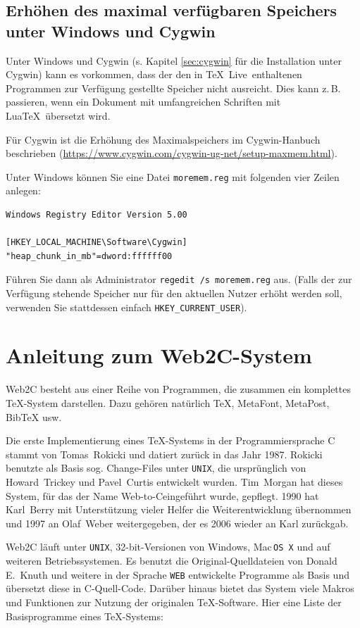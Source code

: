 \documentclass[12pt,ngerman,a4paper,fullparskip]{scrreprt}
\newcommand{\TL}{\TeX\ Live\xspace}
\newcommand{\acro}[1]{\texttt{#1}}
\newcommand{\code}[1]{\texttt{#1}}
\def\MP{MetaPost}
\def\MF{MetaFont}
\def\BibTeX{Bib\TeX}
\providecommand*{\MacOSX}{Mac\,\acro{OS\,X}\xspace}
\begin{document}
\section{Erhöhen des maximal verfügbaren Speichers unter Windows und Cygwin}
\label{sec:cygwin-maxmem}

Unter Windows und Cygwin (s. Kapitel \ref{sec:cygwin} für die Installation unter
Cygwin) kann es vorkommen, dass der den in \TL\ enthaltenen Programmen zur
Verfügung gestellte Speicher nicht ausreicht. Dies kann z.\,B. passieren, wenn 
ein Dokument mit umfangreichen Schriften mit Lua\TeX\ übersetzt wird.

Für Cygwin ist die Erhöhung des Maximalspeichers im Cygwin-Hanbuch beschrieben
(\url{https://www.cygwin.com/cygwin-ug-net/setup-maxmem.html}).

Unter Windows können Sie eine Datei \code{moremem.reg} mit folgenden vier
Zeilen anlegen:

\begin{verbatim}
Windows Registry Editor Version 5.00

[HKEY_LOCAL_MACHINE\Software\Cygwin]
"heap_chunk_in_mb"=dword:ffffff00
\end{verbatim}

Führen Sie dann als Administrator \code{regedit /s moremem.reg} aus.
(Falls der zur Verfügung stehende Speicher nur für den aktuellen Nutzer
erhöht werden soll, verwenden Sie stattdessen einfach \code{HKEY\_CURRENT\_USER}).

\chapter{Anleitung zum Web2C-System}

Web2C besteht aus einer Reihe von Programmen, die zusammen ein komplettes
\TeX-System darstellen. Dazu gehören natürlich \TeX, \MF, \MP, {\BibTeX} usw.

Die erste Implementierung eines \TeX-Systems in der Programmiersprache C stammt von Tomas~Rokicki und datiert zurück in das Jahr 1987. Rokicki benutzte als Basis sog. Change-Files unter \acro{UNIX}, die ursprünglich von Howard~Trickey und Pavel~Curtis entwickelt wurden. Tim~Morgan hat dieses System, für das der Name  Web-to-C\@ eingeführt wurde, gepflegt. 1990 hat Karl~Berry mit Unterstützung vieler Helfer die Weiterentwicklung übernommen und 1997 an Olaf~Weber weitergegeben, der es 2006 wieder an Karl zurückgab.

Web2C läuft unter \acro{UNIX}, 32-bit-Versionen von Windows, \MacOSX{}
und auf weiteren Betriebssystemen. Es benutzt die
Original-Quelldateien von Donald E.~Knuth und weitere in der
Sprache \texttt{WEB} entwickelte Programme als Basis und übersetzt diese
in C-Quell-Code. Darüber hinaus bietet das System viele Makros und
Funktionen zur Nutzung der originalen \TeX-Software. Hier eine
Liste der Basisprogramme eines \TeX-Systems:
\end{document}
